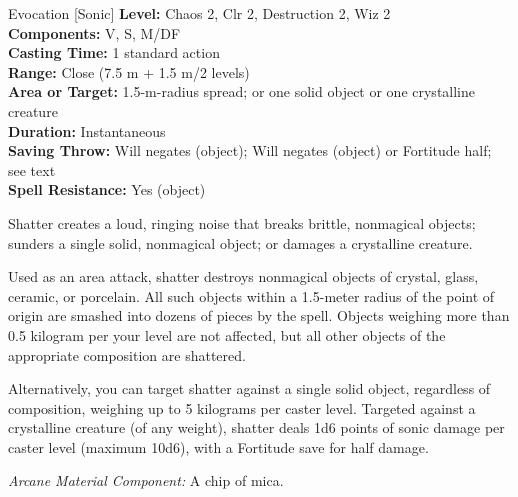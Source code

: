 {Evocation [Sonic]}
{
	\textbf{Level:}
	Chaos 2, Clr 2, Destruction 2, Wiz 2\\
	\textbf{Components:}
	V, S, M/DF\\
	\textbf{Casting Time:}
	1 standard action\\
	\textbf{Range:}
	Close (7.5 m + 1.5 m/2 levels)\\
	\textbf{Area or Target:}
	1.5-m-radius spread; or one solid object or one crystalline creature\\
	\textbf{Duration:}
	Instantaneous\\
	\textbf{Saving Throw:}
	Will negates (object); Will negates (object) or Fortitude half; see text\\
	\textbf{Spell Resistance:}
	Yes (object)\\
}
{
	Shatter creates a loud, ringing noise that breaks brittle, nonmagical objects; sunders a single solid, nonmagical object; or damages a crystalline creature.

	Used as an area attack, shatter destroys nonmagical objects of crystal, glass, ceramic, or porcelain. All such objects within a 1.5-meter radius of the point of origin are smashed into dozens of pieces by the spell. Objects weighing more than 0.5 kilogram per your level are not affected, but all other objects of the appropriate composition are shattered.

	Alternatively, you can target shatter against a single solid object, regardless of composition, weighing up to 5 kilograms per caster level. Targeted against a crystalline creature (of any weight), shatter deals 1d6 points of sonic damage per caster level (maximum 10d6), with a Fortitude save for half damage.

	\textit{Arcane Material Component:}
	A chip of mica.

}
